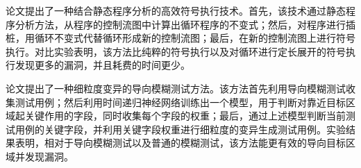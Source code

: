 \begin{cabstract}
论文提出了一种结合静态程序分析的高效符号执行技术。首先，该技术通过静态程序分析方法，从程序的控制流图中计算出循环程序的不变式；然后，对程序进行插桩，用循环不变式代替循环形成新的控制流图；最后，在新的控制流图上进行符号执行。对比实验表明，该方法比纯粹的符号执行以及对循环进行定长展开的符号执行发现更多的漏洞，并且耗费的时间更少。

论文提出了一种细粒度变异的导向模糊测试方法。该方法首先利用导向模糊测试收集测试用例；然后利用时间递归神经网络训练出一个模型，用于判断对靠近目标区域起关键作用的字段，同时收集每个字段的权重；最后，通过上述模型判断当前测试用例的关键字段，并利用关键字段权重进行细粒度的变异生成测试用例。实验结果表明，相对于导向模糊测试以及普通的模糊测试，该方法能更有效的导向目标区域并发现漏洞。


\end{cabstract}

